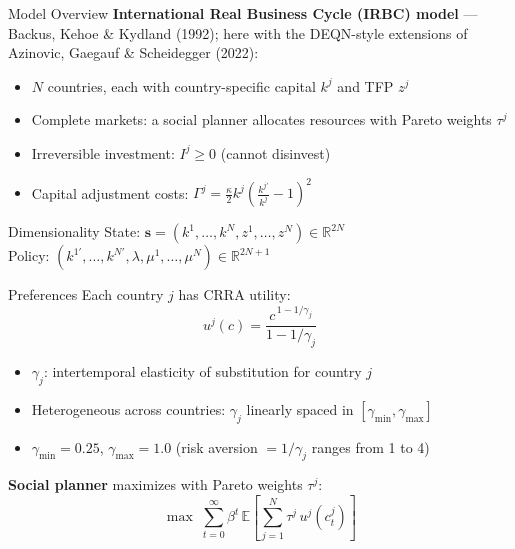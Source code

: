 \documentclass[aspectratio=169,11pt]{beamer}
\newcommand{\emphc}[1]{\textcolor{harvardcrimson}{#1}}
\newcommand{\R}{\mathbb{R}}
\newcommand{\E}[1]{\mathbb{E}\!\left[#1\right]}
\begin{document}
\begin{frame}{Model Overview}
\textbf{International Real Business Cycle (IRBC) model} --- Backus, Kehoe \& Kydland (1992); here with the DEQN-style extensions of Azinovic, Gaegauf \& Scheidegger (2022):

\vspace{0.5em}
\begin{itemize}
    \item $N$ countries, each with \emphc{country-specific capital} $k^j$ and \emphc{TFP} $z^j$
    \item \emphc{Complete markets}: a social planner allocates resources with Pareto weights $\tau^j$
    \item \emphc{Irreversible investment}: $I^j \geq 0$ (cannot disinvest)
    \item \emphc{Capital adjustment costs}: $\Gamma^j = \frac{\kappa}{2} k^j \!\left(\frac{k^{j\prime}}{k^j} - 1\right)^{\!2}$
\end{itemize}

\vspace{0.5em}
\begin{block}{Dimensionality}
State: $\bm{s} = (k^1, \ldots, k^N, z^1, \ldots, z^N) \in \R^{2N}$\\
Policy: $(k^{1\prime}, \ldots, k^{N\prime}, \lambda, \mu^1, \ldots, \mu^N) \in \R^{2N+1}$
\end{block}
\end{frame}

\begin{frame}{Preferences}
Each country $j$ has \emphc{CRRA utility}:
\[
u^j(c) = \frac{c^{\,1 - 1/\gamma_j}}{1 - 1/\gamma_j}
\]

\vspace{0.3em}
\begin{itemize}
    \item $\gamma_j$: intertemporal elasticity of substitution for country $j$
    \item \emphc{Heterogeneous} across countries: $\gamma_j$ linearly spaced in $[\gamma_{\min}, \gamma_{\max}]$
    \item $\gamma_{\min} = 0.25$, $\gamma_{\max} = 1.0$ (risk aversion $= 1/\gamma_j$ ranges from 1 to 4)
\end{itemize}

\vspace{0.5em}
\textbf{Social planner} maximizes with Pareto weights $\tau^j$:
\[
\max \; \sum_{t=0}^{\infty} \beta^t \, \E{\sum_{j=1}^{N} \tau^j \, u^j(c_t^j)}
\]
\end{frame}
\end{document}
